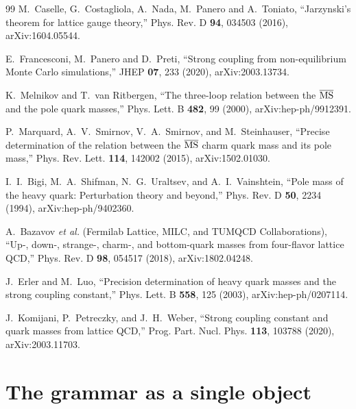 \documentclass[aps,twocolumn,superscriptaddress,nofootinbib,floatfix]{revtex4-2}
\begin{document}
\begin{thebibliography}{99}
M.~Caselle, G.~Costagliola, A.~Nada, M.~Panero and A.~Toniato, ``Jarzynski's theorem for lattice gauge theory,'' Phys. Rev. D \textbf{94}, 034503 (2016), arXiv:1604.05544.

E.~Francesconi, M.~Panero and D.~Preti, ``Strong coupling from non-equilibrium Monte Carlo simulations,'' JHEP \textbf{07}, 233 (2020), arXiv:2003.13734.

K.~Melnikov and T.~van Ritbergen, ``The three-loop relation between the $\overline{\rm MS}$ and the pole quark masses,'' Phys. Lett. B \textbf{482}, 99 (2000), arXiv:hep-ph/9912391.

P.~Marquard, A.~V.~Smirnov, V.~A.~Smirnov, and M.~Steinhauser, ``Precise determination of the relation between the $\overline{\rm MS}$ charm quark mass and its pole mass,'' Phys. Rev. Lett. \textbf{114}, 142002 (2015), arXiv:1502.01030.

I.~I.~Bigi, M.~A.~Shifman, N.~G.~Uraltsev, and A.~I.~Vainshtein, ``Pole mass of the heavy quark: Perturbation theory and beyond,'' Phys. Rev. D \textbf{50}, 2234 (1994), arXiv:hep-ph/9402360.

A.~Bazavov \textit{et al.} (Fermilab Lattice, MILC, and TUMQCD Collaborations), ``Up-, down-, strange-, charm-, and bottom-quark masses from four-flavor lattice QCD,'' Phys. Rev. D \textbf{98}, 054517 (2018), arXiv:1802.04248.

J.~Erler and M.~Luo, ``Precision determination of heavy quark masses and the strong coupling constant,'' Phys. Lett. B \textbf{558}, 125 (2003), arXiv:hep-ph/0207114.

J.~Komijani, P.~Petreczky, and J.~H.~Weber, ``Strong coupling constant and quark masses from lattice QCD,'' Prog. Part. Nucl. Phys. \textbf{113}, 103788 (2020), arXiv:2003.11703.

\end{thebibliography}

\appendix

\section{The grammar as a single object}
\label{app:grammar}
\end{document}
